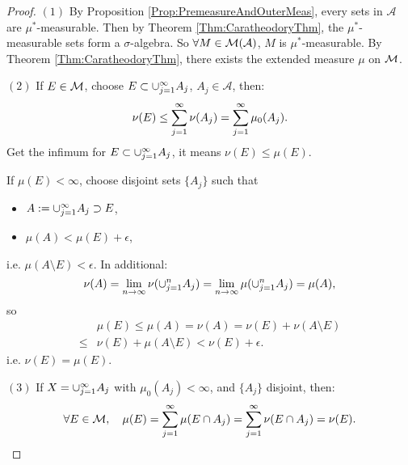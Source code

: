\begin{proof}
    $(1)$ By Proposition \ref{Prop:PremeasureAndOuterMeas}, 
    every sets in $\mathcal{A}$ are $\mu^{*}$-measurable. Then by 
    Theorem \ref{Thm:CaratheodoryThm}, the $\mu^{*}$-measurable 
    sets form a $\sigma$-algebra. 
    So $\forall M\in\mathcal{M}(\mathcal{A})$, $M$ is $\mu^{*}$-measurable. 
    By Theorem \ref{Thm:CaratheodoryThm}, 
    there exists the extended measure $\mu$ on $\mathcal{M}$. 

    $(2)$ If $E\in\mathcal{M}$, choose $E\subset\cup_{j=1}^{\infty}A_{j}$, 
    $A_{j}\in\mathcal{A}$, then:
    \begin{displaymath}
        \nu(E)\le\sum_{j=1}^{\infty}\nu(A_{j})
        =\sum_{j=1}^{\infty}\mu_{0}(A_j).
    \end{displaymath}
    Get the infimum for $E\subset\cup_{j=1}^{\infty}A_j$, it means 
    $\nu(E)\le\mu(E)$. 

    If $\mu(E)<\infty$, choose disjoint sets $\{A_{j}\}$ such that 
    \begin{itemize}
        \item $A:=\cup_{j=1}^{\infty}A_j\supset E$,
        \item $\mu(A)<\mu(E)+\epsilon$,
    \end{itemize}
    i.e. $\mu(A\setminus E)<\epsilon$. In additional:
    \begin{displaymath}
        \nu(A)=\lim_{n\rightarrow\infty}\nu(\cup_{j=1}^{n}A_j)
        =\lim_{n\rightarrow\infty}\mu(\cup_{j=1}^{n}A_j)=\mu(A),
    \end{displaymath}
    so 
    \begin{displaymath}
        \begin{array}{rl}
        &\mu(E)\le\mu(A)=\nu(A)=\nu(E)+\nu(A\setminus E)\\
        \le&\nu(E)+\mu(A\setminus E)<\nu(E)+\epsilon.
        \end{array}
    \end{displaymath}
    i.e. $\nu(E)=\mu(E)$.

    $(3)$ If $X=\cup_{j=1}^{\infty}A_{j}$ with $\mu_{0}(A_j)<\infty$, 
    and $\{A_j\}$ disjoint, 
    then:
    \begin{displaymath}
        \forall E\in\mathcal{M},\quad \mu(E)=\sum_{j=1}^{\infty}\mu(E\cap A_j)
        =\sum_{j=1}^{\infty}\nu(E\cap A_j)=\nu(E).
    \end{displaymath}
\end{proof}
